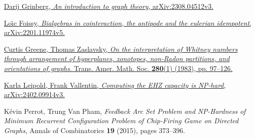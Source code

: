 \documentclass[numbers=enddot,12pt,final,onecolumn,notitlepage]{scrartcl}%
\theoremstyle{definition}
\theoremstyle{plainsl}
\begin{document}
\begin{thebibliography}{99999999}                                                                                         %


\href{https://arxiv.org/abs/2308.04512v3}{Darij Grinberg,
\textit{An introduction to graph theory}, arXiv:2308.04512v3.}

%
\href{https://arxiv.org/abs/2201.11974v5}{Lo\"{\i}c Foissy, \textit{Bialgebras
in cointeraction, the antipode and the eulerian idempotent},
arXiv:2201.11974v5.}

%
\href{https://doi.org/10.1090/S0002-9947-1983-0712251-1}{Curtis Greene, Thomas
Zaslavsky, \textit{On the interpretation of Whitney numbers through
arrangement of hyperplanes, zonotopes, non-Radon partitions, and orientations
of graphs}. Trans. Amer. Math. Soc. \textbf{280}(1) (1983), pp. 97--126.}

\href{https://arxiv.org/abs/2402.09914v3}{Karla
Leipold, Frank Vallentin, \textit{Computing the EHZ capacity is NP-hard},
arXiv:2402.09914v3.}

K\'{e}vin Perrot, Trung Van Pham, \textit{Feedback
Arc Set Problem and NP-Hardness of Minimum Recurrent Configuration Problem of
Chip-Firing Game on Directed Graphs}, Annals of Combinatorics \textbf{19}
(2015), pages 373--396.
\end{thebibliography}
\end{document}

